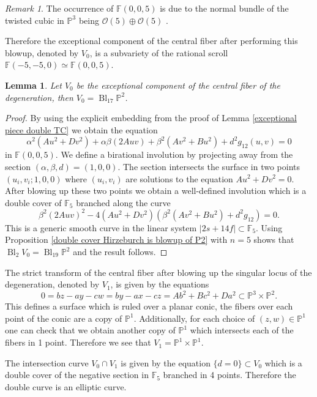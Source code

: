 \documentclass[a4paper]{amsart}
\theoremstyle{definition}
\theoremstyle{plain}
\newtheorem{lemma}[defn]{Lemma}
\theoremstyle{remark}
\newtheorem{rk}[defn]{Remark}
\newcommand{\PS}{\mathbb{P}}
\newcommand{\F}{\mathbb{F}}
\begin{document}
\begin{rk}
The occurrence of $\F(0,0,5)$ is due to the normal bundle of the twisted cubic in $\mathbb{P}^3$ being $\mathcal{O}(5)\oplus \mathcal{O}(5)$ \cite[Prop. 6]{EVdV81}.
\end{rk}

Therefore the exceptional component of the central fiber after performing this blowup, denoted by $V_0$, is a subvariety of the rational scroll $\F(-5,-5,0)\simeq \F(0,0,5)$.

\begin{lemma}
Let $V_0$ be the exceptional component of the central fiber of the degeneration, then $V_0 = \operatorname{Bl}_{17}\PS^2$.
\end{lemma}

\begin{proof}
By using the explicit embedding from the proof of Lemma \ref{exceptional piece double TC} we obtain the equation
$$\alpha^2(Au^2+Dv^2)+\alpha\beta(2Auv)+\beta^2(Av^2+Bu^2)+d^2g_{12}(u,v) =0$$
in $\F(0,0,5)$. We define a birational involution by projecting away from the section $(\alpha,\beta,d)=(1,0,0)$. The section intersects the surface in two points $(u_i,v_i;1,0,0)$ where $(u_i,v_i)$ are solutions to the equation $Au^2+Dv^2=0$. After blowing up these two points we obtain a well-defined involution which is a double cover of $\F_5$ branched along the curve
$$\beta^2(2Auv)^2-4(Au^2+Dv^2)(\beta^2(Av^2+Bu^2)+d^2g_{12})=0.$$
This is a generic smooth curve in the linear system $|2s+14f| \subset \F_5$. Using Proposition \ref{double cover Hirzeburch is blowup of P2} with $n=5$ shows that $\operatorname{Bl}_2V_0=\operatorname{Bl}_{19}\PS^2$ and the result follows.
\end{proof}

The strict transform of the central fiber after blowing up the singular locus of the degeneration, denoted by $V_1$, is given by the equations 
$$0=bz-ay-cw=by-ax-cz = Ab^2+Bc^2+Da^2 \subset \mathbb{P}^3\times \mathbb{P}^2.$$
This defines a surface which is ruled over a planar conic, the fibers over each point of the conic are a copy of $\PS^1$. Additionally, for each choice of $(z,w)\in\PS^1$ one can check that we obtain another copy of $\PS^1$ which intersects each of the fibers in 1 point. Therefore we see that $V_1=\PS^1\times\PS^1$.

The intersection curve $V_0\cap V_1$ is given by the equation $\{d=0\}\subset V_0$ which is a double cover of the negative section in $\F_5$ branched in 4 points. Therefore the double curve is an elliptic curve.
\end{document}
